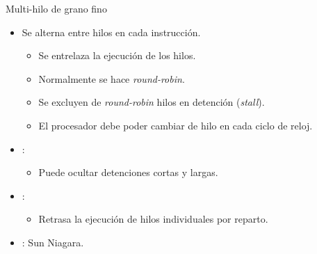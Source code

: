 \begin{frame}[t]{Multi-hilo de grano fino}
\begin{itemize}
  \item Se alterna entre hilos en cada instrucción.
    \begin{itemize}
      \item Se entrelaza la ejecución de los hilos.
      \item Normalmente se hace \emph{round-robin}.
      \item Se excluyen de \emph{round-robin} hilos en detención (\emph{stall}).
      \item El procesador debe poder cambiar de hilo en cada ciclo de reloj.
    \end{itemize}

  \item {}:
    \begin{itemize}
      \item Puede ocultar detenciones cortas y largas.
    \end{itemize}

  \item {}:
    \begin{itemize}
      \item Retrasa la ejecución de hilos individuales por reparto.
    \end{itemize}

  \item {}: Sun Niagara.
\end{itemize}
\end{frame}

